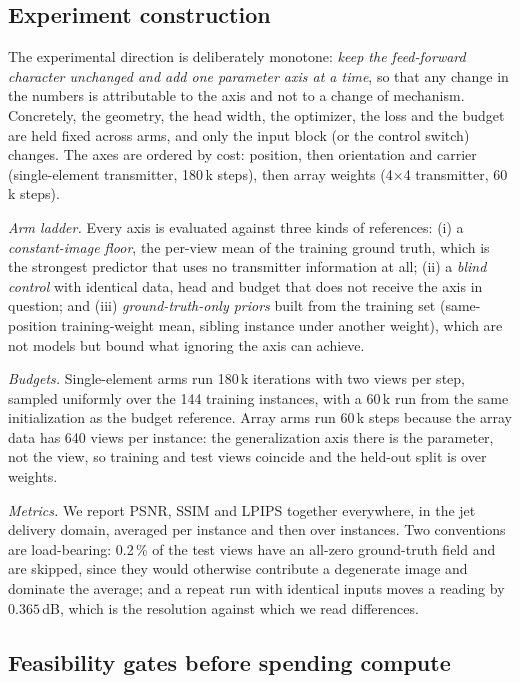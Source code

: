\documentclass[conference]{IEEEtran}
\begin{document}
\subsection{Experiment construction}
\label{sec:expsetup}

The experimental direction is deliberately monotone: \emph{keep the
feed-forward character unchanged and add one parameter axis at a time}, so that
any change in the numbers is attributable to the axis and not to a change of
mechanism. Concretely, the geometry, the head width, the optimizer, the loss
and the budget are held fixed across arms, and only the input block (or the
control switch) changes. The axes are ordered by cost: position, then
orientation and carrier (single-element transmitter, 180\,k steps), then array
weights (4$\times$4 transmitter, 60\,k steps).

\emph{Arm ladder.} Every axis is evaluated against three kinds of references:
(i) a \emph{constant-image floor}, the per-view mean of the training ground
truth, which is the strongest predictor that uses no transmitter information at
all; (ii) a \emph{blind control} with identical data, head and budget that does
not receive the axis in question; and (iii) \emph{ground-truth-only priors}
built from the training set (same-position training-weight mean, sibling
instance under another weight), which are not models but bound what ignoring
the axis can achieve.

\emph{Budgets.} Single-element arms run 180\,k iterations with two views per
step, sampled uniformly over the 144 training instances, with a 60\,k run from
the same initialization as the budget reference. Array arms run 60\,k steps
because the array data has 640 views per instance: the generalization axis there
is the parameter, not the view, so training and test views coincide and the
held-out split is over weights.

\emph{Metrics.} We report PSNR, SSIM \cite{ssim} and LPIPS \cite{lpips} together
everywhere, in the jet delivery domain, averaged per instance and then over
instances. Two conventions are load-bearing: 0.2\,\% of the test views have an
all-zero ground-truth field and are skipped, since they would otherwise
contribute a degenerate image and dominate the average; and a repeat run with
identical inputs moves a reading by $0.365$\,dB, which is the resolution
against which we read differences.

\subsection{Feasibility gates before spending compute}
\label{sec:gate}
\end{document}

